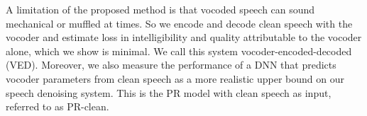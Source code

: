 \documentclass{article}
\begin{document}
A limitation of the proposed method is that vocoded speech can sound mechanical or muffled at times. So we encode and decode clean speech with the vocoder and estimate loss in intelligibility and quality attributable to the vocoder alone, which we show is minimal. We call this system vocoder-encoded-decoded (VED). Moreover, we also measure the performance of a DNN that predicts vocoder parameters from clean speech as a more realistic upper bound on our speech denoising system. This is the PR model with clean speech as input, referred to as PR-clean.

\end{document}

